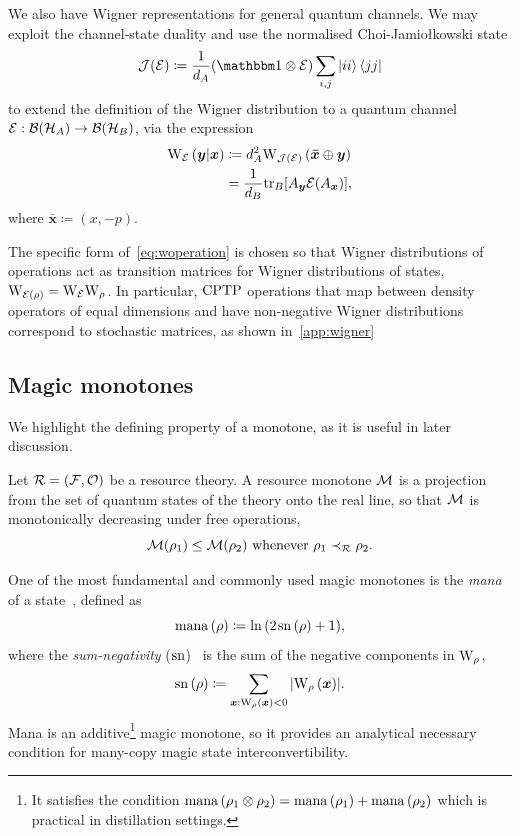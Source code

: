 \documentclass[pra,
aps,
twocolumn,
superscriptaddress,
groupedaddress,
nofootinbib,
reprint
]{revtex4-1}
\begin{document}
We also have Wigner representations for general quantum channels. We may exploit the channel-state duality and use the normalised Choi-Jamio\l{}kowski state 
\begin{equation}\label{eq:cj}
  \J(\E) \coloneqq \frac{1}{d_A}(\id \otimes \E) \sum_{i,j} \ket{ii}\bra{jj}
\end{equation}
to extend the definition of the Wigner distribution to a quantum channel $\mathcal{E}: {\mathcal B}({\mathcal H}_A) \rightarrow {\mathcal B}({\mathcal H}_B)$, via the expression
\begin{align}\label{eq:woperation}
    \W[\bmy|\bmx]{\E} 
    &\coloneqq d_A^2 \W[\bm{\bar x} \oplus \bmy]{\J(\E)} \\
    &= \frac{1}{d_B} \tr_B[A_{\bmy} \E(A_{\bmx})],
\end{align}
where $\bm{\bar x} \coloneqq (x, -p)$.

The specific form of~\cref{eq:woperation} is chosen so that Wigner distributions of operations act as transition matrices for Wigner distributions of states, $\W{\E(\rho)} = \W{\E}\W{\rho}$.
In particular, ${\rm{CPTP}}$ operations that map between density operators of equal dimensions and have non-negative Wigner distributions correspond to stochastic matrices, as shown in~\cref{app:wigner}

\subsection{Magic monotones}
\label{sec:mono}

We highlight the defining property of a monotone, as it is useful in later discussion.
\begin{definition}\label{def:mono}
    Let $\mathcal{R} = (\mathcal{F}, \mathcal{O})$ be a resource theory.
    A resource monotone $\mathcal{M}$ is a projection from the set of quantum states of the theory onto the real line, so that $\mathcal{M}$ is monotonically decreasing under free operations,
    \begin{equation}
        \mathcal{M}(\rho_1) \leq \mathcal{M}(\rho_2)\ \text{whenever}\ \rho_1 \prec_{\mathcal{R}} \rho_2.
    \end{equation}
\end{definition}

One of the most fundamental and commonly used magic monotones is the \emph{mana} of a state~\cite{cit:veitch2}, defined as
\begin{equation}
    {{\rm{mana}}\left(\rho\right)} \coloneqq \ln{(2\hspace{1pt} {{\rm{sn}}\left(\rho\right)} +1)},
\end{equation}
where the \emph{sum-negativity} ($\rm{sn}$)~\cite{cit:veitch2} is the sum of the negative components in $\W{\rho}$,
\begin{equation}
    \sn{\rho} \coloneqq \sum\limits_{\bmx: \W[\bmx]{\rho} < 0} \abs{\W[\bmx]{\rho}}.
\end{equation}
Mana is an additive\footnote{It satisfies the condition ${{\rm{mana}}\left(\rho_1 \otimes \rho_2\right)} = {{\rm{mana}}\left(\rho_1\right)} + {{\rm{mana}}\left(\rho_2\right)}$ which is practical in distillation settings.} magic monotone, so it provides an analytical necessary condition for many-copy magic state interconvertibility.
\end{document}
